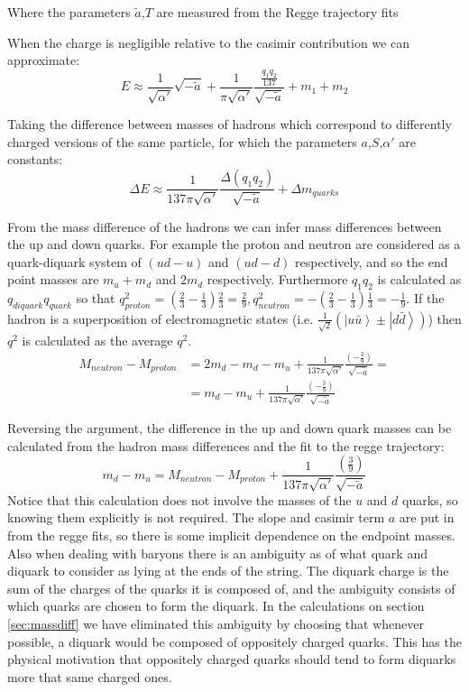 \documentclass[11pt,a4paper]{article}
\begin{document}
Where the parameters $\tilde{a}$,$T$ are measured from the Regge trajectory fits
 
When the charge is negligible relative to the casimir contribution we can approximate:
\begin{equation*}
E\approx\frac{1}{\sqrt{\alpha'}}\sqrt{-\tilde{a}}+\frac{1}{\pi\sqrt{\alpha'}}\frac{\frac{q_1q_2}{137}}{\sqrt{-\tilde{a}}}+m_1+m_2
\end{equation*}

Taking the difference between masses of hadrons which correspond to differently charged versions of the same particle, for which the parameters $a$,$S$,$\alpha'$ are constants:
\begin{equation*}
\Delta E\approx\frac{1}{137\pi\sqrt{\alpha'}}\frac{\Delta (q_1q_2)}{\sqrt{-\tilde{a}}}+\Delta m_{quarks}
\end{equation*}
 
From the mass difference of the hadrons we can infer mass differences between the up and down quarks. For example the proton and neutron are considered as a quark-diquark system of $\left(ud-u\right)$ and $\left(ud-d\right)$ respectively, and so the end point masses are $m_{u}+m_{d}$ and $2m_{d}$ respectively. Furthermore $q_1q_2$ is calculated as $q_{diquark}q_{quark}$ so that $q_{proton}^{2}=\left(\frac{2}{3}-\frac{1}{3}\right)\frac{2}{3}=\frac{2}{9}
, q_{neutron}^{2}=-\left(\frac{2}{3}-\frac{1}{3}\right)\frac{1}{3}=-\frac{1}{9}$. If the hadron is a superposition of electromagnetic states (i.e. $\frac{1}{\sqrt{2}}\left(\left|u\bar{u}\right\rangle \pm\left|d\bar{d}\right\rangle \right)$) then $q^{2}$ is calculated as the average $q^{2}$.
\begin{align*}
M_{neutron}-M_{proton}&=2m_{d}-m_{d}-m_{u}+\frac{1}{137\pi\sqrt{\alpha'}}\frac{\left(-\frac{3}{9}\right)}{\sqrt{-\tilde{a}}}=\\
&=m_{d}-m_{u}+\frac{1}{137\pi\sqrt{\alpha'}}\frac{\left(-\frac{3}{9}\right)}{\sqrt{-\tilde{a}}}
\end{align*}

Reversing the argument, the difference in the up and down quark masses can be calculated from the hadron mass differences and the fit to the regge trajectory:
\begin{equation*}
m_{d}-m_{u}=M_{neutron}-M_{proton}+\frac{1}{137\pi\sqrt{\alpha'}}\frac{\left(\frac{3}{9}\right)}{\sqrt{-\tilde{a}}}
\end{equation*} 
Notice that this calculation does not involve the masses of the $u$ and $d$ quarks, so knowing them explicitly is not required. The slope and casimir term $a$ are put in from the regge fits, so there is some implicit dependence on the endpoint masses. Also when dealing with baryons there is an ambiguity as of what quark and diquark to consider as lying at the ends of the string. The diquark charge is the sum of the charges of the quarks it is composed of, and the ambiguity consists of which quarks are chosen to form the diquark. In the calculations on section \ref{sec:massdiff} we have eliminated this ambiguity by choosing that whenever possible, a diquark would be composed of oppositely charged quarks. This has the physical motivation that oppositely charged quarks should tend to form diquarks more that same charged ones.
\end{document}
